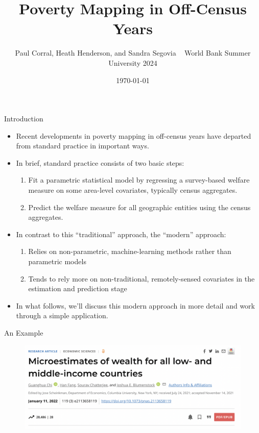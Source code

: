 \documentclass[aspectratio=169, xcolor=dvipsnames]{beamer}
\title[]{Poverty Mapping in Off-Census Years}
\date{\today}
\author[]{Paul Corral, Heath Henderson, and Sandra Segovia \newline
~ \newline
World Bank Summer University 2024}
\begin{document}

\begin{frame}
\titlepage
\end{frame}

\begin{frame}{Introduction}
\begin{itemize}
\item Recent developments in poverty mapping in off-census years have
departed from standard practice in important ways.
\item In brief, standard practice consists of two basic steps:
\begin{enumerate}
\item Fit a parametric statistical model by regressing a survey-based 
welfare measure on some area-level covariates, typically census aggregates.
\item Predict the welfare measure for all geographic entities using the census
aggregates.
\end{enumerate}
\item In contrast to this ``traditional'' approach, the ``modern'' approach:
\begin{enumerate}
\item Relies on non-parametric, machine-learning methods rather than 
parametric models
\item Tends to rely more on non-traditional, remotely-sensed covariates in the estimation and
prediction stage
\end{enumerate}
\item In what follows, we'll discuss this modern approach in more detail and 
work through a simple application.
\end{itemize}
\end{frame}

\begin{frame}{An Example}
\begin{figure}[h!]
  \centering
  \includegraphics[width=0.8 \textwidth]{Chi_1}
\end{figure}
\end{frame}
\end{document}
